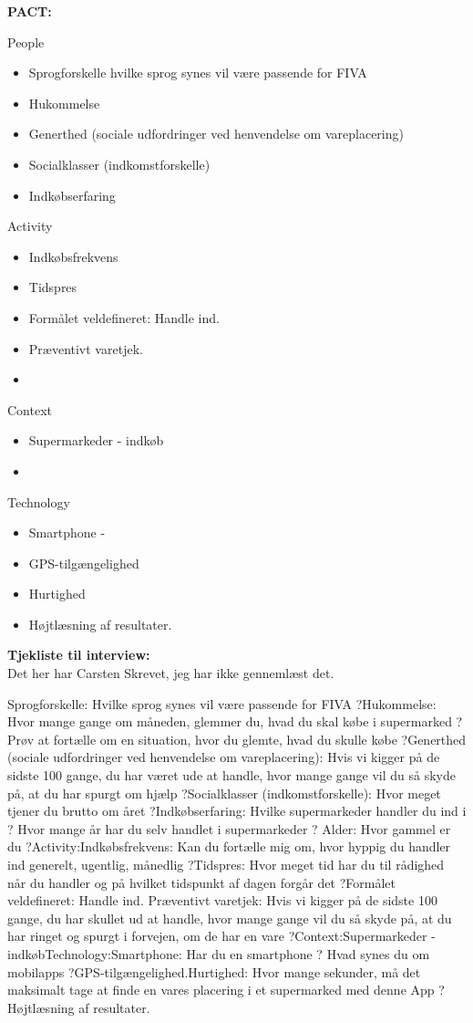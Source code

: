 \documentclass[12pt]{article}
\begin{document}
\textbf{PACT:}

People
\begin{itemize}
\item Sprogforskelle hvilke sprog synes vil v\ae re passende for FIVA
\item Hukommelse 
\item Generthed (sociale udfordringer ved henvendelse om vareplacering)
\item Socialklasser (indkomstforskelle)
\item Indkøbserfaring
\end{itemize}

Activity
\begin{itemize}
\item Indkøbsfrekvens  
\item Tidspres
\item Formålet veldefineret: Handle ind.
\item Præventivt varetjek. 
\item   
\end{itemize}


Context
\begin{itemize}
\item Supermarkeder - indkøb 
\item  
\end{itemize}


Technology
\begin{itemize}
\item Smartphone -   
\item GPS-tilgængelighed
\item Hurtighed
\item Højtlæsning af resultater. 
\end{itemize}

\textbf{Tjekliste til interview:}\\

Det her har Carsten Skrevet, jeg har ikke genneml\ae st det.

Sprogforskelle: Hvilke sprog synes vil være passende for FIVA ?Hukommelse: Hvor mange gange om måneden, glemmer du, hvad du skal købe i supermarked ?
Prøv at fortælle om en situation, hvor du glemte, hvad du skulle købe ?Generthed (sociale udfordringer ved henvendelse om vareplacering): Hvis vi kigger på de sidste 100 gange, du har været ude at handle, hvor mange gange vil du så skyde på, at du har spurgt om hjælp ?Socialklasser (indkomstforskelle): Hvor meget tjener du brutto om året ?Indkøbserfaring: Hvilke supermarkeder handler du ind i ?
Hvor mange år har du selv handlet i supermarkeder ?
Alder: Hvor gammel er du ?Activity:Indkøbsfrekvens: Kan du fortælle mig om, hvor hyppig du handler ind generelt, ugentlig, månedlig ?Tidspres: Hvor meget tid har du til rådighed når du handler og på hvilket tidspunkt af dagen forgår det ?Formålet veldefineret: Handle ind. Præventivt varetjek: Hvis vi kigger på de sidste 100 gange, du har skullet ud at handle, hvor mange gange vil du så skyde på, at du har ringet og spurgt i forvejen, om de har en vare ?Context:Supermarkeder - indkøbTechnology:Smartphone: Har du en smartphone ?
Hvad synes du om mobilapps ?GPS-tilgængelighed.Hurtighed: Hvor mange sekunder, må det maksimalt tage at finde en vares placering i et supermarked med denne App ?Højtlæsning af resultater.
\end{document}
